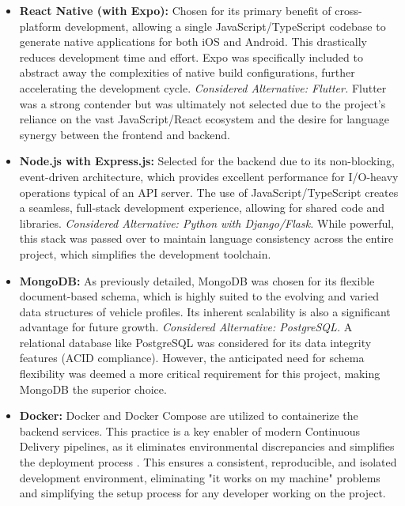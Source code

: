 \begin{itemize}
    \item \textbf{React Native (with Expo):} Chosen for its primary benefit of cross-platform development, allowing a single JavaScript/TypeScript codebase to generate native applications for both iOS and Android. This drastically reduces development time and effort. Expo was specifically included to abstract away the complexities of native build configurations, further accelerating the development cycle.
    \newline\textit{Considered Alternative: Flutter.} Flutter was a strong contender but was ultimately not selected due to the project's reliance on the vast JavaScript/React ecosystem and the desire for language synergy between the frontend and backend.
    
    \textgap
    
    \item \textbf{Node.js with Express.js:} Selected for the backend due to its non-blocking, event-driven architecture, which provides excellent performance for I/O-heavy operations typical of an API server. The use of JavaScript/TypeScript creates a seamless, full-stack development experience, allowing for shared code and libraries.
    \newline\textit{Considered Alternative: Python with Django/Flask.} While powerful, this stack was passed over to maintain language consistency across the entire project, which simplifies the development toolchain.
    
    \textgap
    
    \item \textbf{MongoDB:} As previously detailed, MongoDB was chosen for its flexible document-based schema, which is highly suited to the evolving and varied data structures of vehicle profiles. Its inherent scalability is also a significant advantage for future growth.
    \newline\textit{Considered Alternative: PostgreSQL.} A relational database like PostgreSQL was considered for its data integrity features (ACID compliance). However, the anticipated need for schema flexibility was deemed a more critical requirement for this project, making MongoDB the superior choice.
    
    \textgap

    \item \textbf{Docker:} Docker and Docker Compose are utilized to containerize the backend services. This practice is a key enabler of modern Continuous Delivery pipelines, as it eliminates environmental discrepancies and simplifies the deployment process \cite{Humble2010ContinuousDelivery}. This ensures a consistent, reproducible, and isolated development environment, eliminating "it works on my machine" problems and simplifying the setup process for any developer working on the project.
\end{itemize}

